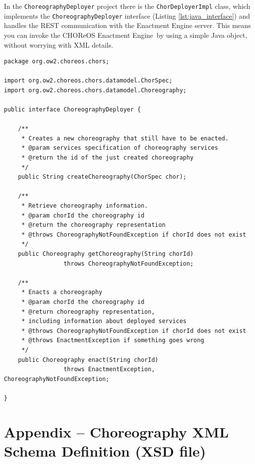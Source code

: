 \documentclass[a4paper, 10pt]{article}
\newcommand{\ee}{CHOReOS Enactment Engine}
\begin{document}
In the \verb!ChoreographyDeployer! project there is the \verb!ChorDeployerImpl! class, which implements the \verb!ChoreographyDeployer! interface (Listing \ref{lst:java_interface}) and handles the REST communication with the Enactment Engine server. This means you can invoke the \ee\ by using a simple Java object, without worrying with XML details.

\lstset{language=Java}
\begin{lstlisting}[caption=\ee\ Java interface, label=lst:java_interface]
package org.ow2.choreos.chors;

import org.ow2.choreos.chors.datamodel.ChorSpec;
import org.ow2.choreos.chors.datamodel.Choreography;

public interface ChoreographyDeployer {
	
	/**
	 * Creates a new choreography that still have to be enacted.
	 * @param services specification of choreography services
	 * @return the id of the just created choreography
	 */
	public String createChoreography(ChorSpec chor);
	
	/**
	 * Retrieve choreography information.
	 * @param chorId the choreography id
	 * @return the choreography representation
	 * @throws ChoreographyNotFoundException if chorId does not exist 
	 */
	public Choreography getChoreography(String chorId) 
	             throws ChoreographyNotFoundException;

	/**
	 * Enacts a choreography
	 * @param chorId the choreography id
	 * @return choreography representation, 
	 * including information about deployed services 
	 * @throws ChoreographyNotFoundException if chorId does not exist 
	 * @throws EnactmentException if something goes wrong 
	 */
	public Choreography enact(String chorId) 
	             throws EnactmentException, ChoreographyNotFoundException;
	
}
\end{lstlisting}

\section*{Appendix -- Choreography XML Schema Definition (XSD file)}
\end{document}
